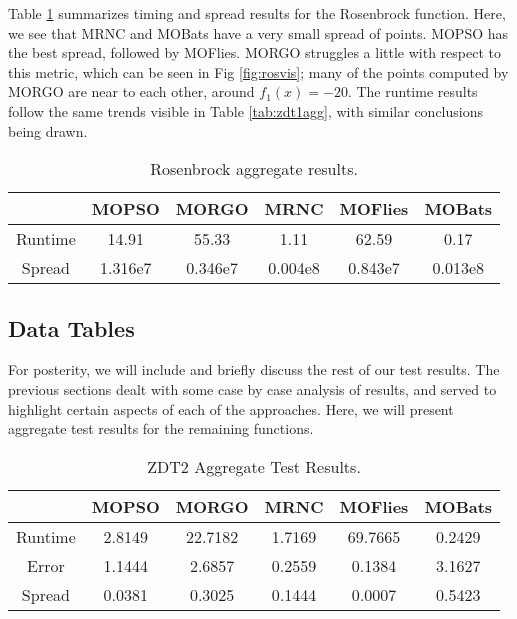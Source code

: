 \documentclass[letterpaper, 10 pt, conference]{ieeeconf}  %
\begin{document}
Table \ref{tab:rosresults} summarizes timing and spread results for the Rosenbrock function. Here, we see that MRNC and MOBats have a very small spread of points. MOPSO has the best spread, followed by MOFlies. MORGO struggles a little with respect to this metric, which can be seen in Fig \ref{fig:rosvis}; many of the points computed by MORGO are near to each other, around $f_1(x) = -20$. The runtime results follow the same trends visible in Table \ref{tab:zdt1agg}, with similar conclusions being drawn.


\begin{table}[htp]
\centering
 \begin{tabular}{||c c c c c c||} 
 \hline
 & MOPSO & MORGO & MRNC & MOFlies & MOBats \\
 \hline \hline
 Runtime & 14.91 & 55.33 & 1.11 & 62.59 & 0.17 \\
 \hline
 Spread & 1.316e7 & 0.346e7 & 0.004e8 & 0.843e7 & 0.013e8 \\
 \hline
\end{tabular}
\caption{Rosenbrock aggregate results.}
\label{tab:rosresults}
\end{table}

\vspace*{-\baselineskip} 
\vspace*{-\baselineskip} 

\subsection{Data Tables}

For posterity, we will include and briefly discuss the rest of our test results. The previous sections dealt with some case by case analysis of results, and served to highlight certain aspects of each of the approaches. Here, we will present aggregate test results for the remaining functions.

\begin{table}[h!]
\centering
 \begin{tabular}{||c c c c c c||} 
 \hline
 & MOPSO & MORGO & MRNC & MOFlies & MOBats \\
 \hline \hline
 Runtime & 2.8149 & 22.7182 & 1.7169 & 69.7665 & 0.2429 \\
 \hline
 Error & 1.1444 & 2.6857 & 0.2559 & 0.1384 & 3.1627 \\
 \hline
 Spread & 0.0381 & 0.3025 & 0.1444 & 0.0007 & 0.5423 \\
 \hline
\end{tabular}
\caption{ZDT2 Aggregate Test Results.}
\end{table}
\end{document}
